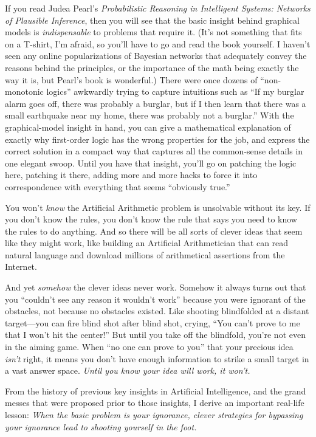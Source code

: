 {
 If you read Judea Pearl's \textit{Probabilistic
Reasoning in Intelligent Systems: Networks of Plausible
Inference}, then you will see that the basic insight
behind graphical models is \textit{indispensable} to problems that
require it. (It's not something that fits on a T-shirt,
I'm afraid, so you'll have to go and
read the book yourself. I haven't seen any online
popularizations of Bayesian networks that adequately convey the reasons
behind the principles, or the importance of the math being exactly the
way it is, but Pearl's book is wonderful.) There were
once dozens of ``non-monotonic
logics'' awkwardly trying to capture intuitions such
as ``If my burglar alarm goes off, there was probably
a burglar, but if I then learn that there was a small earthquake near
my home, there was probably not a burglar.'' With the
graphical-model insight in hand, you can give a mathematical
explanation of exactly why first-order logic has the wrong properties
for the job, and express the correct solution in a compact way that
captures all the common-sense details in one elegant swoop. Until you
have that insight, you'll go on patching the logic
here, patching it there, adding more and more hacks to force it into
correspondence with everything that seems ``obviously
true.''}

{
 You won't \textit{know} the Artificial Arithmetic
problem is unsolvable without its key. If you don't
know the rules, you don't know the rule that says you
need to know the rules to do anything. And so there will be all sorts
of clever ideas that seem like they might work, like building an
Artificial Arithmetician that can read natural language and download
millions of arithmetical assertions from the Internet.}

{
 And yet \textit{somehow} the clever ideas never work. Somehow it
always turns out that you ``couldn't
see any reason it wouldn't work''
because you were ignorant of the obstacles, not because no obstacles
existed. Like shooting blindfolded at a distant target---you can fire
blind shot after blind shot, crying, ``You
can't prove to me that I won't hit the
center!'' But until you take off the blindfold,
you're not even in the aiming game. When
``no one can prove to you'' that
your precious idea \textit{isn't} right, it means you
don't have enough information to strike a small target
in a vast answer space. \textit{Until you know your idea will work, it
won't.}}

{
 From the history of previous key insights in Artificial
Intelligence, and the grand messes that were proposed prior to those
insights, I derive an important real-life lesson: \textit{When the
basic problem is your ignorance, clever strategies for bypassing your
ignorance lead to shooting yourself in the foot.}}

